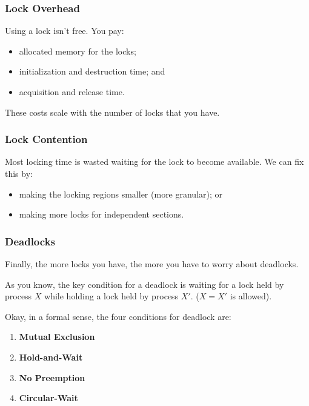 \begin{frame}
\frametitle{Lock Overhead}

  Using a lock isn't free. You pay:
  \begin{itemize}
    \item allocated memory for the locks;
    \item initialization and destruction time; and
    \item acquisition and release time.
  \end{itemize}


  These costs scale with the number of locks that you have.
\end{frame}


\begin{frame}
\frametitle{Lock Contention}

 Most locking time is wasted waiting for the lock to become available.
We can fix this by:
      \begin{itemize}
        \item making the locking regions smaller (more granular); or
        \item making more locks for independent sections.
      \end{itemize}



\end{frame}

\begin{frame}
\frametitle{Deadlocks}

Finally, the more locks you have, the more you have to worry about deadlocks.

As you know, the key condition for a deadlock is waiting for a lock held by process $X$ while holding a lock held by process $X'$. ($X = X'$ is allowed).

Okay, in a formal sense, the four conditions for deadlock are:

\begin{enumerate}
	\item \textbf{Mutual Exclusion}
	\item \textbf{Hold-and-Wait}
	\item \textbf{No Preemption}
	\item \textbf{Circular-Wait}
\end{enumerate}

\end{frame}


